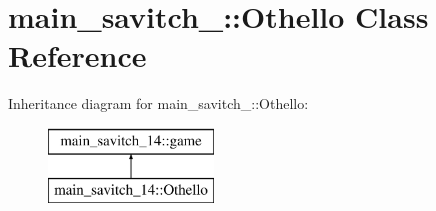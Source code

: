 \hypertarget{classmain__savitch__14_1_1_othello}{}\section{main\+\_\+savitch\+\_\+:\+:Othello Class Reference}
\label{classmain__savitch__14_1_1_othello}
Inheritance diagram for main\+\_\+savitch\+\_\+:\+:Othello\+:\begin{figure}[H]
\begin{center}
\leavevmode
\includegraphics[height=2.000000cm]{classmain__savitch__14_1_1_othello}
\end{center}
\end{figure}
